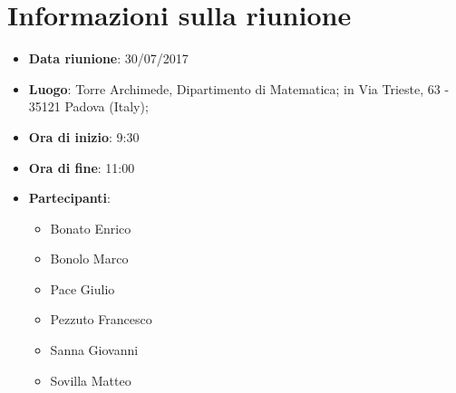 \documentclass[../AnalisiDeiRequisiti.tex]{subfiles}
\begin{document}
	\section*{Informazioni sulla riunione}
		\begin{itemize}
			\item \textbf{Data riunione}: 30/07/2017
			\item \textbf{Luogo}: Torre Archimede, Dipartimento di Matematica; in Via Trieste, 63 - 35121 Padova (Italy);
			\item \textbf{Ora di inizio}: 9:30
			\item \textbf{Ora di fine}: 11:00
			\item \textbf{Partecipanti}:
				\begin{itemize}
					\item Bonato Enrico
					\item Bonolo Marco
					\item Pace Giulio
					\item Pezzuto Francesco
					\item Sanna Giovanni
					\item Sovilla Matteo
				\end{itemize}
		\end{itemize}
\end{document}
